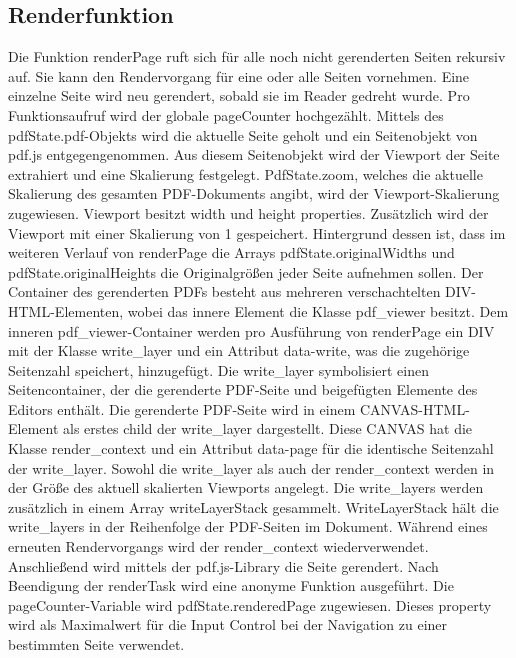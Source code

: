 \subsection{Renderfunktion}
Die Funktion renderPage ruft sich für alle noch nicht gerenderten Seiten rekursiv auf. Sie kann den Rendervorgang für eine oder alle Seiten vornehmen. Eine einzelne Seite wird neu gerendert, sobald sie im Reader gedreht wurde. Pro Funktionsaufruf wird der globale pageCounter hochgezählt. Mittels des pdfState.pdf-Objekts wird die aktuelle Seite geholt und ein Seitenobjekt von pdf.js entgegengenommen. Aus diesem Seitenobjekt wird der Viewport der Seite extrahiert und eine Skalierung festgelegt. PdfState.zoom, welches die aktuelle Skalierung des gesamten PDF-Dokuments angibt, wird der Viewport-Skalierung zugewiesen. Viewport besitzt width und height properties. Zusätzlich wird der Viewport mit einer Skalierung von 1 gespeichert. Hintergrund dessen ist, dass im weiteren Verlauf von renderPage die Arrays pdfState.originalWidths und pdfState.originalHeights die Originalgrößen jeder Seite aufnehmen sollen. Der Container des gerenderten PDFs besteht aus mehreren verschachtelten DIV-HTML-Elementen, wobei das innere Element die Klasse pdf\_viewer besitzt. Dem inneren pdf\_viewer-Container werden pro Ausführung von renderPage ein DIV mit der Klasse write\_layer und ein Attribut data-write, was die zugehörige Seitenzahl speichert, hinzugefügt. Die write\_layer symbolisiert einen Seitencontainer, der die gerenderte PDF-Seite und beigefügten Elemente des Editors enthält. Die gerenderte PDF-Seite wird in einem CANVAS-HTML-Element als erstes child der write\_layer dargestellt. Diese CANVAS hat die Klasse render\_context und ein Attribut data-page für die identische Seitenzahl der write\_layer. Sowohl die write\_layer als auch der render\_context werden in der Größe des aktuell skalierten Viewports angelegt. Die write\_layers werden zusätzlich in einem Array writeLayerStack gesammelt. WriteLayerStack hält die write\_layers in der Reihenfolge der PDF-Seiten im Dokument. Während eines erneuten Rendervorgangs wird der render\_context wiederverwendet. Anschließend wird mittels der pdf.js-Library die Seite gerendert. Nach Beendigung der renderTask wird eine anonyme Funktion ausgeführt. Die pageCounter-Variable wird pdfState.renderedPage zugewiesen. Dieses property wird als Maximalwert für die Input Control bei der Navigation zu einer bestimmten Seite verwendet.

